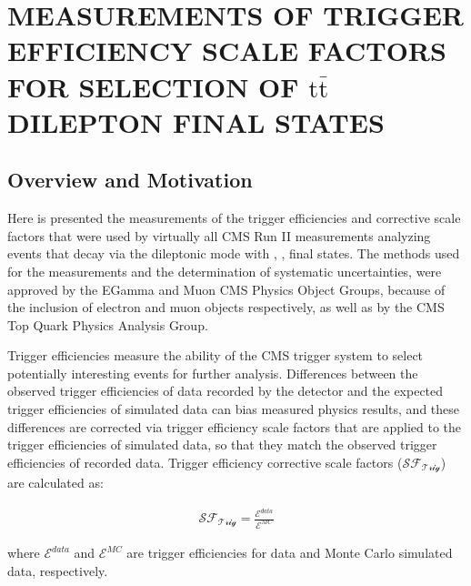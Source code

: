 
\chapter{MEASUREMENTS OF TRIGGER EFFICIENCY SCALE FACTORS FOR SELECTION OF \ensuremath{\mathrm{t\bar{t}}} DILEPTON FINAL STATES}

\section{Overview and Motivation}
Here is presented the measurements of the trigger efficiencies and corrective scale factors that were used by virtually all CMS Run II measurements analyzing \ttbar events that decay via the dileptonic mode with \ee, \emu, \mumu final states.  
The methods used for the measurements and the determination of systematic uncertainties, were approved by the EGamma and Muon CMS Physics Object Groups, because of the inclusion of electron and muon objects respectively, as well as by the CMS Top Quark Physics Analysis Group.

Trigger efficiencies measure the ability of the CMS trigger system to select potentially interesting events for further analysis.
Differences between the observed trigger efficiencies of data recorded by the detector and the expected trigger efficiencies of simulated data can bias measured physics results, and these differences are corrected via trigger efficiency scale factors that are applied to the trigger efficiencies of simulated data, so that they match the observed trigger efficiencies of recorded data.
Trigger efficiency corrective scale factors ($\mathcal{SF_{\text{Trig}}}$) are calculated as:
\begin{linenomath*}
\begin{align}
\mathcal{SF_{\text{Trig}}} = \frac{\mathcal{E}^{data}}{\mathcal{E}^{MC}}
\label{SF}
\end{align}
\end{linenomath*}
where $\mathcal{E}^{data}$ and $\mathcal{E}^{MC}$ are trigger efficiencies for data and Monte Carlo simulated data, respectively.

